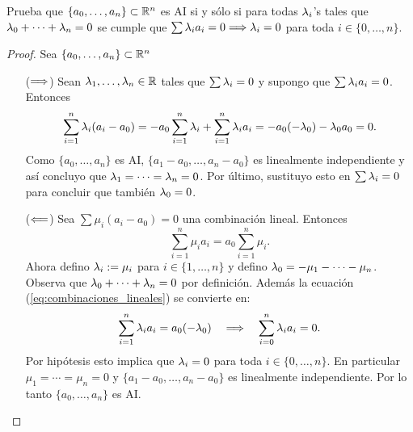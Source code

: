 \begin{ejercicio}\label{ej:44}
  Prueba que $\{a_0,\ldots,a_n\}\subset\mathbb{R}^n$ es AI si y s\'olo si para todas $\lambda_i$'s tales que
  $\lambda_0+\cdots+\lambda_n=0$ se cumple que $\sum\lambda_ia_i=0\Longrightarrow\lambda_i=0$ para toda $i\in\{0,\ldots,n\}$.
\end{ejercicio}
\begin{proof} Sea $\{a_0,\ldots,a_n\}\subset\mathbb{R}^n$%
  \begin{enumerate}
  \item[($\Longrightarrow$)] Sean $\lambda_1,\ldots,\lambda_n\in\mathbb{R}$ tales que $\sum\lambda_i=0$ y supongo
    que $\sum \lambda_ia_i=0$. Entonces
    \[
      \sum_{i=1}^n\lambda_i(a_i-a_0)=
      -a_0\sum_{i=1}^n\lambda_i+\sum_{i=1}^n\lambda_ia_i=
      -a_0(-\lambda_0)-\lambda_0a_0=
      0.
    \]
    Como $\{a_0,\ldots,a_n\}$ es AI, $\{a_1-a_0,\ldots,a_n-a_0\}$ es linealmente independiente y
    as\'i concluyo que $\lambda_1=\cdots=\lambda_n=0$. Por \'ultimo, sustituyo esto en $\sum\lambda_i=0$
    para concluir que tambi\'en $\lambda_0=0$.
  \item[($\Longleftarrow$)] Sea $\sum\mu_i(a_i-a_0)=0$ una combinaci\'on lineal. Entonces
    \begin{equation}\label{eq:combinaciones_lineales}
      \sum_{i=1}^n\mu_i a_i=a_0\sum_{i=1}^n\mu_i.
    \end{equation}
    Ahora defino $\lambda_i:=\mu_i$ para $i\in\{1,\ldots,n\}$ y defino $\lambda_0=-\mu_1-\cdots-\mu_n$.
    Observa que $\lambda_0+\cdots+\lambda_n=0$ por definici\'on. Adem\'as la ecuaci\'on
    (\ref{eq:combinaciones_lineales}) se convierte en:
    \[
      \sum_{i=1}^n\lambda_ia_i=a_0(-\lambda_0) \quad\Longrightarrow\quad \sum_{i=0}^n\lambda_ia_i=0.
    \]
    Por hip\'otesis esto implica que $\lambda_i=0$ para toda $i\in\{0,\ldots,n\}$. En particular
    $\mu_1=\cdots=\mu_n=0$ y $\{a_1-a_0,\ldots,a_n-a_0\}$ es linealmente independiente. Por lo
    tanto $\{a_0,\ldots,a_n\}$ es AI.
  \end{enumerate}
\end{proof}%

